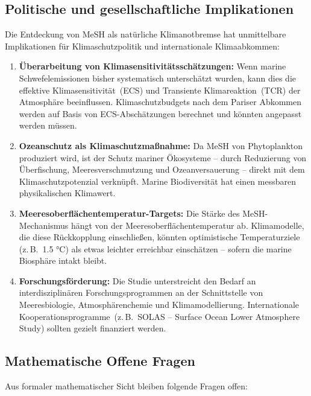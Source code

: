 ﻿\documentclass[a4paper,12pt]{article}
\theoremstyle{definition}
\begin{document}
\subsection{Politische und gesellschaftliche Implikationen}

Die Entdeckung von MeSH als natürliche Klimanotbremse hat unmittelbare Implikationen für
Klimaschutzpolitik und internationale Klimaabkommen:

\begin{enumerate}
  \item \textbf{Überarbeitung von Klimasensitivitätsschätzungen:} Wenn marine Schwefelemissionen
        bisher systematisch unterschätzt wurden, kann dies die effektive Klimasensitivität~(ECS)
        und Transiente Klimareaktion~(TCR) der Atmosphäre beeinflussen. Klimaschutzbudgets nach
        dem Pariser Abkommen werden auf Basis von ECS-Abschätzungen berechnet und könnten
        angepasst werden müssen.
  \item \textbf{Ozeanschutz als Klimaschutzmaßnahme:} Da MeSH von Phytoplankton produziert wird,
        ist der Schutz mariner Ökosysteme -- durch Reduzierung von Überfischung, Meeresverschmutzung
        und Ozeanversauerung -- direkt mit dem Klimaschutzpotenzial verknüpft. Marine Biodiversität
        hat einen messbaren physikalischen Klimawert.
  \item \textbf{Meeresoberflächentemperatur-Targets:} Die Stärke des MeSH-Mechanismus hängt von
        der Meeresoberflächentemperatur ab. Klimamodelle, die diese Rückkopplung einschließen,
        könnten optimistische Temperaturziele (z.\,B.\ 1.5 °C) als etwas leichter erreichbar
        einschätzen -- sofern die marine Biosphäre intakt bleibt.
  \item \textbf{Forschungsförderung:} Die Studie unterstreicht den Bedarf an interdisziplinären
        Forschungsprogrammen an der Schnittstelle von Meeresbiologie, Atmosphärenchemie und
        Klimamodellierung. Internationale Kooperationsprogramme~(z.\,B.\ SOLAS -- Surface Ocean
        Lower Atmosphere Study) sollten gezielt finanziert werden.
\end{enumerate}

\subsection{Mathematische Offene Fragen}

Aus formaler mathematischer Sicht bleiben folgende Fragen offen:
\end{document}
